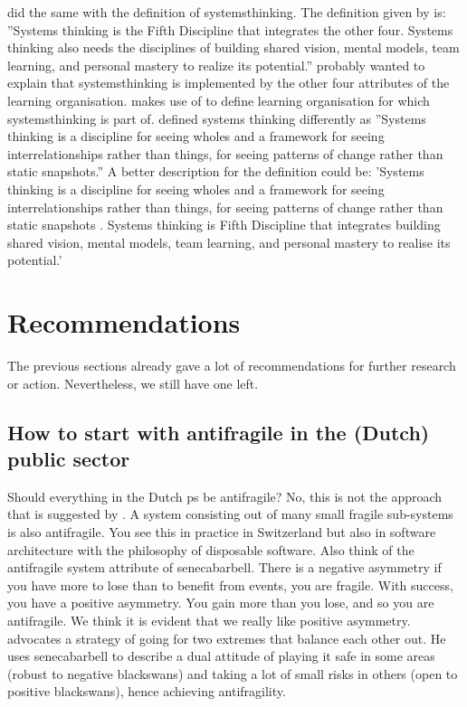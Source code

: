 \Textcite{Botjes2021} did the same with the definition of \gls{systemsthinking}. The definition given by \textcite{Botjes2021} is: ''Systems thinking is the Fifth Discipline that integrates the other four. Systems thinking also needs the disciplines of building shared vision, mental models, team learning, and personal mastery to realize its potential.'' \textcite{Botjes2021} probably wanted to explain that \gls{systemsthinking} is implemented by the other four \glspl{attribute} of the learning organisation.  \textcite{Botjes2021} makes use of \textcite{Senge1994} to define learning organisation for which \gls{systemsthinking} is part of. \textcite{Senge1994} defined systems thinking differently as ''Systems thinking is a discipline for seeing wholes and a framework for seeing interrelationships rather than things, for seeing patterns of change rather than static snapshots.'' A better description for the definition could be: 'Systems thinking is a discipline for seeing wholes and a framework for seeing interrelationships rather than things, for seeing patterns of change rather than static snapshots \parencite{Senge1994}. Systems thinking is \textcite{Senge1994} Fifth Discipline that integrates building shared vision, mental models, team learning, and personal mastery to realise its potential.'

\section{Recommendations}
\label{sec:reccomandations}
The previous sections already gave a lot of recommendations for further research or action. Nevertheless, we still have one left.

\subsection{How to start with antifragile in the (Dutch) public sector}
\label{sub:howtostart}
Should everything in the Dutch \gls{ps} be \gls{antifragile}? No, this is not the approach that is suggested by \textcite{Taleb2012}. A system consisting out of many small \gls{fragile} sub-systems is also \gls{antifragile}. You see this in practice in Switzerland but also in software architecture with the philosophy of disposable software. Also think of the \gls{antifragile} system \gls{attribute} of \gls{senecabarbell}. There is a negative asymmetry if you have more to lose than to benefit from events, you are fragile. With success, you have a positive asymmetry. You gain more than you lose, and so you are \gls{antifragile}. We think it is evident that we really like positive asymmetry. \textcite{Taleb2012} advocates a strategy of going for two extremes that balance each other out. He uses \gls{senecabarbell} to describe a dual attitude of playing it safe in some areas (robust to negative \glspl{blackswan}) and taking a lot of small risks in others (open to positive \glspl{blackswan}), hence achieving \gls{antifragility}.

